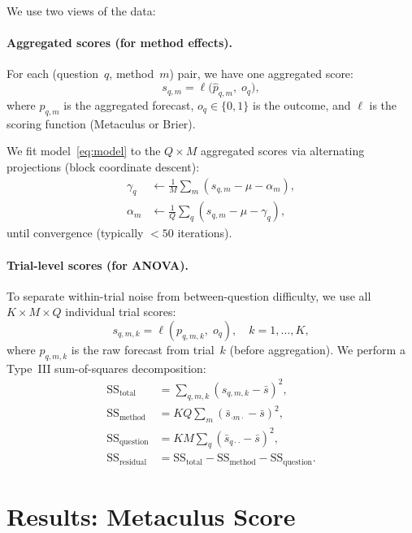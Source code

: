\documentclass[11pt]{article}
\begin{document}
We use two views of the data:

\paragraph{Aggregated scores (for method effects).}
For each (question~$q$, method~$m$) pair, we have one aggregated score:
\begin{equation}
  s_{q,m} = \ell\!\bigl(\hat{p}_{q,m},\; o_q\bigr),
\end{equation}
where $\hat{p}_{q,m}$ is the aggregated forecast, $o_q \in \{0,1\}$ is the
outcome, and $\ell$ is the scoring function (Metaculus or Brier).

We fit model~\eqref{eq:model} to the $Q \times M$ aggregated scores
via alternating projections (block coordinate descent):
\begin{align}
  \gamma_q &\leftarrow \frac{1}{M} \sum_m (s_{q,m} - \mu - \alpha_m), \\
  \alpha_m &\leftarrow \frac{1}{Q} \sum_q (s_{q,m} - \mu - \gamma_q),
\end{align}
until convergence (typically $< 50$ iterations).

\paragraph{Trial-level scores (for ANOVA).}
To separate within-trial noise from between-question difficulty,
we use all $K \times M \times Q$ individual trial scores:
\begin{equation}
  s_{q,m,k} = \ell(p_{q,m,k},\; o_q), \quad k = 1, \ldots, K,
\end{equation}
where $p_{q,m,k}$ is the raw forecast from trial~$k$ (before aggregation).
We perform a Type~III sum-of-squares decomposition:
\begin{align}
  \mathrm{SS}_{\mathrm{total}} &= \sum_{q,m,k} (s_{q,m,k} - \bar{s})^2, \\
  \mathrm{SS}_{\mathrm{method}} &= KQ \sum_m (\bar{s}_{\cdot m \cdot} - \bar{s})^2, \\
  \mathrm{SS}_{\mathrm{question}} &= KM \sum_q (\bar{s}_{q \cdot \cdot} - \bar{s})^2, \\
  \mathrm{SS}_{\mathrm{residual}} &= \mathrm{SS}_{\mathrm{total}}
    - \mathrm{SS}_{\mathrm{method}} - \mathrm{SS}_{\mathrm{question}}.
\end{align}


\section{Results: Metaculus Score}
\end{document}
